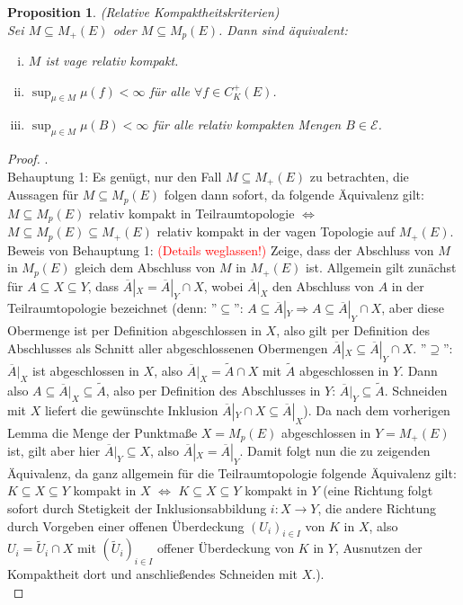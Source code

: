 \documentclass[twoside]{article}
\newtheorem{proposition}[theorem]{Proposition}
\theoremstyle{definition}
\begin{document}
\begin{proposition}(Relative Kompaktheitskriterien)\\
Sei $M \subseteq M_+(E)$ oder $M \subseteq M_p(E)$. Dann sind äquivalent:
\begin{enumerate}[(i)]
\item $M$ ist vage relativ kompakt.
\item $\sup_{\mu \in M} \mu(f) < \infty$  für alle $\forall f \in C_K^+(E)$.
\item $\sup_{\mu \in M} \mu(B) < \infty$ für alle relativ kompakten Mengen $B \in \mathcal{E}$.
\end{enumerate}
\end{proposition}

\begin{proof} .\\
Behauptung 1: Es genügt, nur den Fall $M \subseteq M_+(E)$ zu betrachten, die Aussagen für $M \subseteq M_p(E)$ folgen dann sofort, da folgende Äquivalenz gilt: $M \subseteq M_p(E)$ relativ kompakt in Teilraumtopologie $\Leftrightarrow$ $M \subseteq M_p(E) \subseteq M_+(E)$ relativ kompakt in der vagen Topologie auf $M_+(E)$.\\

Beweis von Behauptung 1: \textcolor{red}{(Details weglassen!)} Zeige, dass der Abschluss von $M$ in $M_p(E)$ gleich dem Abschluss von $M$ in $M_+(E)$ ist. Allgemein gilt zunächst für $A \subseteq X \subseteq Y$, dass $\overline{A}|_X = \overline{A}|_Y \cap X$, wobei $\overline{A}|_X$ den Abschluss von $A$ in der Teilraumtopologie bezeichnet (denn: ''$\subseteq$'': $A \subseteq \overline{A}|_Y \Longrightarrow A \subseteq \overline{A}|_Y \cap X$, aber diese Obermenge ist per Definition abgeschlossen in $X$, also gilt per Definition des Abschlusses als Schnitt aller abgeschlossenen Obermengen $\overline{A}|_X \subseteq \overline{A}|_Y \cap X$. ''$\supseteq$'': $\overline{A}|_X$ ist abgeschlossen in $X$, also $\overline{A}|_X = \tilde{A} \cap X$ mit $\tilde{A}$ abgeschlossen in $Y$. Dann also $A \subseteq \overline{A}|_X \subseteq \tilde{A}$, also per Definition des Abschlusses in $Y$: $\overline{A}|_Y \subseteq \tilde{A}$. Schneiden mit $X$ liefert die gewünschte Inklusion $\overline{A}|_Y \cap X \subseteq \overline{A}|_X$). Da nach dem vorherigen Lemma die Menge der Punktmaße $X = M_p(E)$ abgeschlossen in $Y = M_+(E)$ ist, gilt aber hier $\overline{A}|_Y \subseteq X$, also $\overline{A}|_X = \overline{A}|_Y$. Damit folgt nun die zu zeigenden Äquivalenz, da ganz allgemein für die Teilraumtopologie folgende Äquivalenz gilt: $K \subseteq X \subseteq Y$ kompakt in $X$ $\Leftrightarrow$ $K \subseteq X \subseteq Y$ kompakt in $Y$ (eine Richtung folgt sofort durch Stetigkeit der Inklusionsabbildung $i:X \to Y$, die andere Richtung durch Vorgeben einer offenen Überdeckung $(U_i)_{i \in I}$ von $K$ in $X$, also $U_i = \tilde{U}_i \cap X$ mit $(\tilde{U}_i)_{i \in I}$ offener Überdeckung von $K$ in $Y$, Ausnutzen der Kompaktheit dort und anschließendes Schneiden mit $X$.).\\


\end{proof}
\end{document}
